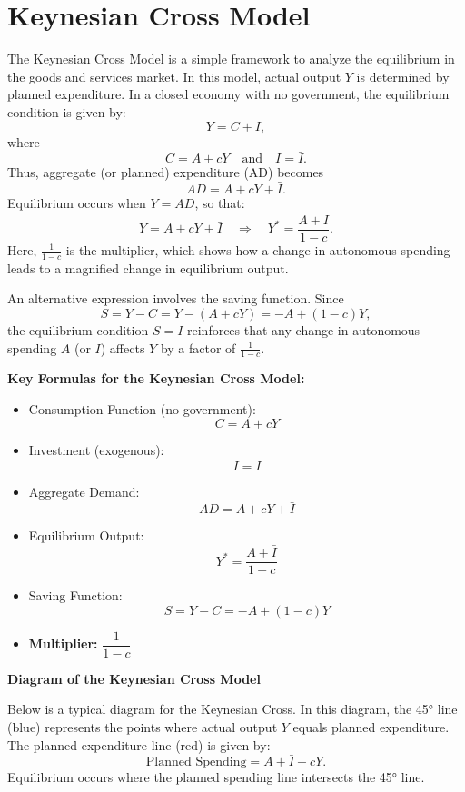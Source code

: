 \chapter*{Keynesian Cross Model}

The Keynesian Cross Model is a simple framework to analyze the equilibrium in the goods and services market. In this model, actual output \(Y\) is determined by planned expenditure. In a closed economy with no government, the equilibrium condition is given by:
\[
Y = C + I,
\]
where
\[
C = A + cY \quad \text{and} \quad I = \bar{I}.
\]
Thus, aggregate (or planned) expenditure (AD) becomes
\[
AD = A + cY + \bar{I}.
\]
Equilibrium occurs when \(Y = AD\), so that:
\[
Y = A + cY + \bar{I} \quad \Longrightarrow \quad Y^* = \frac{A + \bar{I}}{1 - c}.
\]
Here, \(\frac{1}{1-c}\) is the multiplier, which shows how a change in autonomous spending leads to a magnified change in equilibrium output.

An alternative expression involves the saving function. Since
\[
S = Y - C = Y - (A + cY) = -A + (1-c)Y,
\]
the equilibrium condition \(S = I\) reinforces that any change in autonomous spending \(A\) (or \(\bar{I}\)) affects \(Y\) by a factor of \(\frac{1}{1-c}\).

\bigskip

\textbf{Key Formulas for the Keynesian Cross Model:}
\begin{itemize}
    \item Consumption Function (no government):
    \[
    C = A + cY
    \]
    \item Investment (exogenous):
    \[
    I = \bar{I}
    \]
    \item Aggregate Demand:
    \[
    AD = A + cY + \bar{I}
    \]
    \item Equilibrium Output:
    \[
    Y^* = \frac{A + \bar{I}}{1 - c}
    \]
    \item Saving Function:
    \[
    S = Y - C = -A + (1-c)Y
    \]
    \item \textbf{Multiplier:} \(\dfrac{1}{1-c}\)
\end{itemize}

\bigskip

\textbf{Diagram of the Keynesian Cross Model}

Below is a typical diagram for the Keynesian Cross. In this diagram, the 45° line (blue) represents the points where actual output \(Y\) equals planned expenditure. The planned expenditure line (red) is given by:
\[
\text{Planned Spending} = A + \bar{I} + cY.
\]
Equilibrium occurs where the planned spending line intersects the 45° line.

